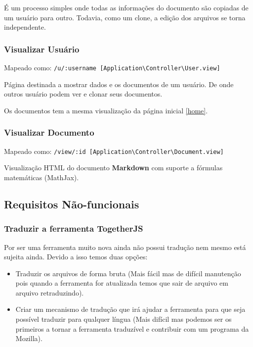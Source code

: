 É um processo simples onde todas as informações do documento são
copiadas de um usuário para outro. Todavia, como um clone, a edição dos
arquivos se torna independente.

\subsubsection{Visualizar Usuário}

Mapeado como:
\texttt{/u/:username {[}Application\textbackslash{}Controller\textbackslash{}User.view{]}}

Página destinada a mostrar dados e os documentos de um usuário. De onde
outros usuário podem ver e clonar seus documentos.

Os documentos tem a mesma visualização da página inicial \ref{home}.

\subsubsection{Visualizar Documento \label{view-document}}

Mapeado como:
\texttt{/view/:id {[}Application\textbackslash{}Controller\textbackslash{}Document.view{]}}

Visualização HTML do documento \textbf{Markdown} com suporte a fórmulas
matemáticas (MathJax).

\subsection{Requisitos Não-funcionais}

\subsubsection{Traduzir a ferramenta TogetherJS}

Por ser uma ferramenta muito nova ainda não possui tradução nem mesmo
está sujeita ainda. Devido a isso temos duas opções:

\begin{itemize}
\item
  Traduzir os arquivos de forma bruta (Mais fácil mas de difícil
  manutenção pois quando a ferramenta for atualizada temos que sair de
  arquivo em arquivo retraduzindo).
\item
  Criar um mecanismo de tradução que irá ajudar a ferramenta para que
  seja possível traduzir para qualquer língua (Mais difícil mas podemos
  ser os primeiros a tornar a ferramenta traduzível e contribuir com um
  programa da Mozilla).
\end{itemize}
